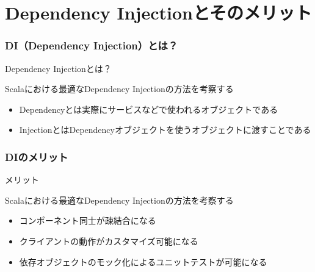 \section{Dependency Injectionとそのメリット}

\begin{frame}
  \frametitle{DI（Dependency Injection）とは？}

  \pause

  \begin{exampleblock}{Dependency Injectionとは？}
    \begin{shadequote}[r]{\scriptsize Scalaにおける最適なDependency Injectionの方法を考察する\cite{scala-mcp}}
      \begin{itemize}
        \item Dependencyとは実際にサービスなどで使われるオブジェクトである
        \item InjectionとはDependencyオブジェクトを使うオブジェクトに渡すことである
      \end{itemize}
    \end{shadequote}
  \end{exampleblock}
\end{frame}

\begin{frame}
  \frametitle{DIのメリット}

  \begin{block}{メリット}
    \begin{shadequote}[r]{\scriptsize Scalaにおける最適なDependency Injectionの方法を考察する\cite{scala-mcp}}
      \begin{itemize}
        \item<2-> コンポーネント同士が疎結合になる
        \item<3-> クライアントの動作がカスタマイズ可能になる
        \item<4-> 依存オブジェクトのモック化によるユニットテストが可能になる
      \end{itemize}
    \end{shadequote}
  \end{block}

  \begin{center}
  \end{center}
\end{frame}

